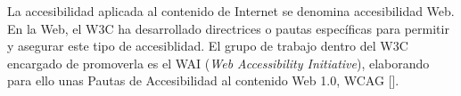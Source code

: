 


La accesibilidad aplicada al contenido de Internet se denomina accesibilidad Web. En la Web, el W3C ha desarrollado directrices o pautas específicas para permitir y asegurar este tipo de accesiblidad. El grupo de trabajo dentro del W3C encargado de promoverla es el WAI (\textit{Web Accessibility Initiative}), elaborando para ello unas Pautas de Accesibilidad al contenido Web 1.0, WCAG [\cite{42}].


